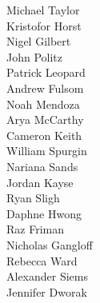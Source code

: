 \documentclass{article}
\begin{document}
\begin{multicols*}{2}
\begin{center}
Michael Taylor\\
Kristofor Horst\\
Nigel Gilbert\\


John Politz\\
Patrick Leopard\\
Andrew Fulsom\\


Noah Mendoza\\
Arya McCarthy\\
Cameron Keith\\


William Spurgin\\
Nariana Sands\\
Jordan Kayse\\


Ryan Sligh\\
Daphne Hwong\\
Raz Friman\\


Nicholas Gangloff\\
Rebecca Ward\\
Alexander Siems\\


Jennifer Dworak\\\end{center}
\end{multicols*}
\end{document}
